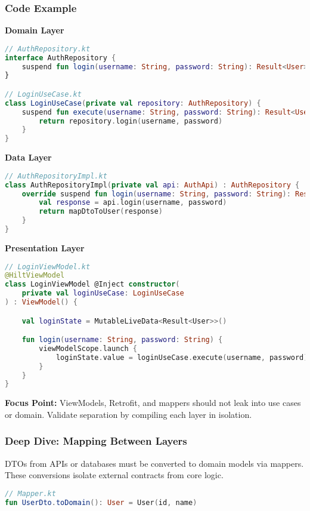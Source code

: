 \documentclass[a4paper,12pt]{article}
\begin{document}
\subsubsection{Code Example}

\textbf{Domain Layer}
\begin{lstlisting}[language=Kotlin]
// AuthRepository.kt
interface AuthRepository {
    suspend fun login(username: String, password: String): Result<User>
}

// LoginUseCase.kt
class LoginUseCase(private val repository: AuthRepository) {
    suspend fun execute(username: String, password: String): Result<User> {
        return repository.login(username, password)
    }
}
\end{lstlisting}

\textbf{Data Layer}
\begin{lstlisting}[language=Kotlin]
// AuthRepositoryImpl.kt
class AuthRepositoryImpl(private val api: AuthApi) : AuthRepository {
    override suspend fun login(username: String, password: String): Result<User> {
        val response = api.login(username, password)
        return mapDtoToUser(response)
    }
}
\end{lstlisting}

\textbf{Presentation Layer}
\begin{lstlisting}[language=Kotlin]
// LoginViewModel.kt
@HiltViewModel
class LoginViewModel @Inject constructor(
    private val loginUseCase: LoginUseCase
) : ViewModel() {

    val loginState = MutableLiveData<Result<User>>()

    fun login(username: String, password: String) {
        viewModelScope.launch {
            loginState.value = loginUseCase.execute(username, password)
        }
    }
}
\end{lstlisting}

\textbf{Focus Point:} ViewModels, Retrofit, and mappers should not leak into use cases or domain. Validate separation by compiling each layer in isolation.

\subsubsection{Deep Dive: Mapping Between Layers}

DTOs from APIs or databases must be converted to domain models via mappers. These conversions isolate external contracts from core logic.

\begin{lstlisting}[language=Kotlin]
// Mapper.kt
fun UserDto.toDomain(): User = User(id, name)
\end{lstlisting}
\end{document}

